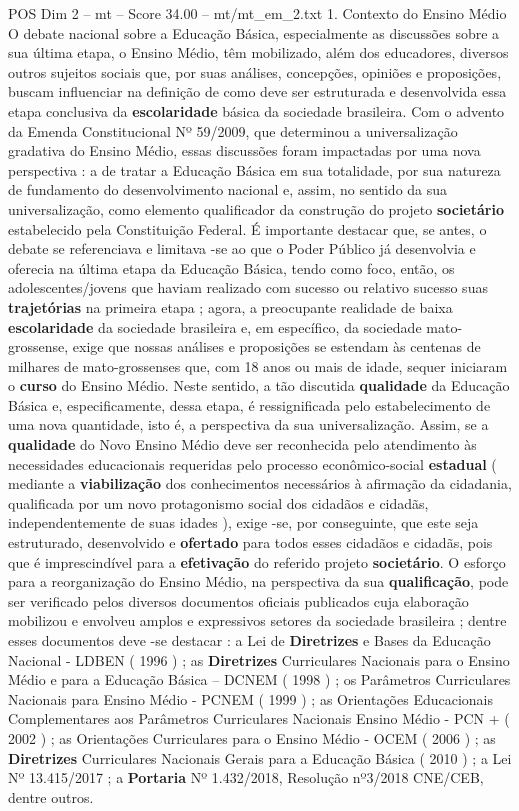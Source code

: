 \begin{textsample}{POS Dim 2 – mt – Score 34.00 – mt/mt\_em\_2.txt}  \label{ex:f2_pos_223}
1.
Contexto do Ensino Médio O debate nacional sobre a Educação Básica, especialmente as discussões sobre a sua última etapa, o Ensino Médio, têm mobilizado, além dos educadores, diversos outros sujeitos sociais que, por suas análises, concepções, opiniões e proposições, buscam influenciar na definição de como deve ser estruturada e desenvolvida essa etapa conclusiva da \textbf{escolaridade} básica da sociedade brasileira.
Com o advento da Emenda Constitucional Nº 59/2009, que determinou a universalização gradativa do Ensino Médio, essas discussões foram impactadas por uma nova perspectiva : a de tratar a Educação Básica em sua totalidade, por sua natureza de fundamento do desenvolvimento nacional e, assim, no sentido da sua universalização, como elemento qualificador da construção do projeto \textbf{societário} estabelecido pela Constituição Federal.
É importante destacar que, se antes, o debate se referenciava e limitava -se ao que o Poder Público já desenvolvia e oferecia na última etapa da Educação Básica, tendo como foco, então, os adolescentes/jovens que haviam realizado com sucesso ou relativo sucesso suas \textbf{trajetórias} na primeira etapa ; agora, a preocupante realidade de baixa \textbf{escolaridade} da sociedade brasileira e, em específico, da sociedade mato-grossense, exige que nossas análises e proposições se estendam às centenas de milhares de mato-grossenses que, com 18 anos ou mais de idade, sequer iniciaram o \textbf{curso} do Ensino Médio.
Neste sentido, a tão discutida \textbf{qualidade} da Educação Básica e, especificamente, dessa etapa, é ressignificada pelo estabelecimento de uma nova quantidade, isto é, a perspectiva da sua universalização.
Assim, se a \textbf{qualidade} do Novo Ensino Médio deve ser reconhecida pelo atendimento às necessidades educacionais requeridas pelo processo econômico-social \textbf{estadual} ( mediante a \textbf{viabilização} dos conhecimentos necessários à afirmação da cidadania, qualificada por um novo protagonismo social dos cidadãos e cidadãs, independentemente de suas idades ), exige -se, por conseguinte, que este seja estruturado, desenvolvido e \textbf{ofertado} para todos esses cidadãos e cidadãs, pois que é imprescindível para a \textbf{efetivação} do referido projeto \textbf{societário}.
O esforço para a reorganização do Ensino Médio, na perspectiva da sua \textbf{qualificação}, pode ser verificado pelos diversos documentos oficiais publicados cuja elaboração mobilizou e envolveu amplos e expressivos setores da sociedade brasileira ; dentre esses documentos deve -se destacar : a Lei de \textbf{Diretrizes} e Bases da Educação Nacional - LDBEN ( 1996 ) ; as \textbf{Diretrizes} Curriculares Nacionais para o Ensino Médio e para a Educação Básica – DCNEM ( 1998 ) ; os Parâmetros Curriculares Nacionais para Ensino Médio - PCNEM ( 1999 ) ; as Orientações Educacionais Complementares aos Parâmetros Curriculares Nacionais Ensino Médio - PCN + ( 2002 ) ; as Orientações Curriculares para o Ensino Médio - OCEM ( 2006 ) ; as \textbf{Diretrizes} Curriculares Nacionais Gerais para a Educação Básica ( 2010 ) ; a Lei Nº 13.415/2017 ; a \textbf{Portaria} Nº 1.432/2018, Resolução nº3/2018 CNE/CEB, dentre outros.

\end{textsample}
